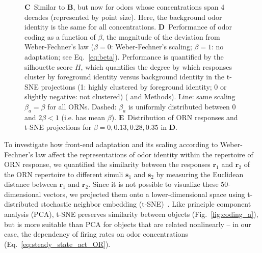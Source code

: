 \documentclass[10pt,prl,aps,showpacs,twocolumn,unsortedaddress,showkeys,linenumbers]{revtex4-1}
\begin{document}
\begin{figure}[!htb]
{{    \textbf{C}~Similar to $\mathbf{B}$, but now for odors whose concentrations span 4 decades (represented by point size). Here, the background odor identity is the same for all concentrations. 
    {\color {blue} 
    \textbf{D}~Performance of odor coding as a function of $\beta$, the magnitude of the deviation from Weber-Fechner's law ($\beta=0$: Weber-Fechner's scaling; $\beta=1$: no adaptation; see Eq.~\ref{eq:beta}). Performance is quantified by the silhouette score $H$, which quantifies the degree by which responses cluster by foreground identity versus background identity in the t-SNE projections (1: highly clustered by foreground identity; 0 or slightly negative: not clustered) (\cite{silhouette_score} and Methods). Line: same scaling $\beta_a=\beta$ for all ORNs. Dashed: $\beta_a$ is uniformly distributed between 0 and $2\beta < 1$ (i.e. has mean $\beta$).
    \textbf{E}~Distribution of ORN responses and t-SNE projections for $\beta = 0, 0.13, 0.28, 0.35$ in $\mathbf{D}$. }}
    }
	\label{fig:coding}
\end{figure}

{\color {blue} 
To investigate how front-end adaptation and its scaling according to Weber-Fechner's law affect the representations of odor identity within the repertoire of ORN response, we quantified the similarity between the responses $\mathbf r_1$ and $\mathbf r_2$ of the ORN repertoire to different simuli $\mathbf{s}_1$ and $\mathbf{s}_2$ by measuring the Euclidean distance between $\mathbf r_1$ and $\mathbf r_2$. Since it is not possible to visualize these 50-dimensional vectors, we projected them onto a lower-dimensional space using t-distributed stochastic neighbor embedding (t-SNE)~\cite{tsne}. Like principle component analysis (PCA), t-SNE preserves similarity between objects (Fig.~\ref{fig:coding_a}), but is more suitable than PCA for objects that are related nonlinearly -- in our case, the dependency of firing rates on odor concentrations (Eq.~\ref{eq:steady_state_act_OR}).
}
\end{document}
